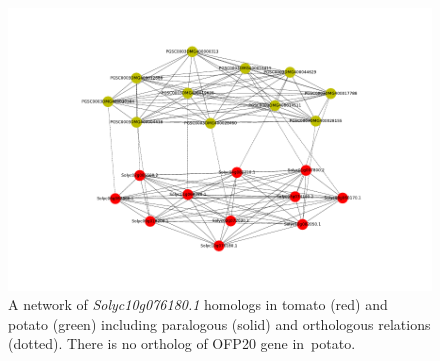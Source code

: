 \documentclass[applsci,article,accept,moreauthors,pdftex]{Definitions/mdpi}
\begin{document}
{ \unskip
\begin{figure}[H]
\centering
\includegraphics[scale=1.25]{Figure6.pdf}
\caption{A network of \textit{Solyc10g076180.1} homologs in tomato (red) and potato (green) including paralogous (solid) and orthologous relations (dotted). There is no ortholog of OFP20 gene in~potato.}
\label{Figure6}
\end{figure}
\unskip

}
\end{document}
